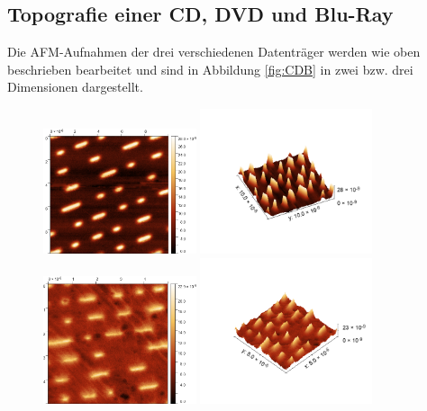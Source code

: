     \subsection{Topografie einer CD, DVD und Blu-Ray}
        Die AFM-Aufnahmen der drei verschiedenen Datenträger werden wie oben beschrieben bearbeitet und sind in Abbildung \ref{fig:CDB} in zwei bzw. drei Dimensionen dargestellt.
        \begin{figure}
            \centering
            \includegraphics[width = 0.40\textwidth]{pictures/CD.png}
            \includegraphics[width = 0.45\textwidth]{pictures/CD3D.png}
            \includegraphics[width = 0.40\textwidth]{pictures/DVD.png}
            \includegraphics[width = 0.45\textwidth]{pictures/DVD3D.png}

\end{figure}
